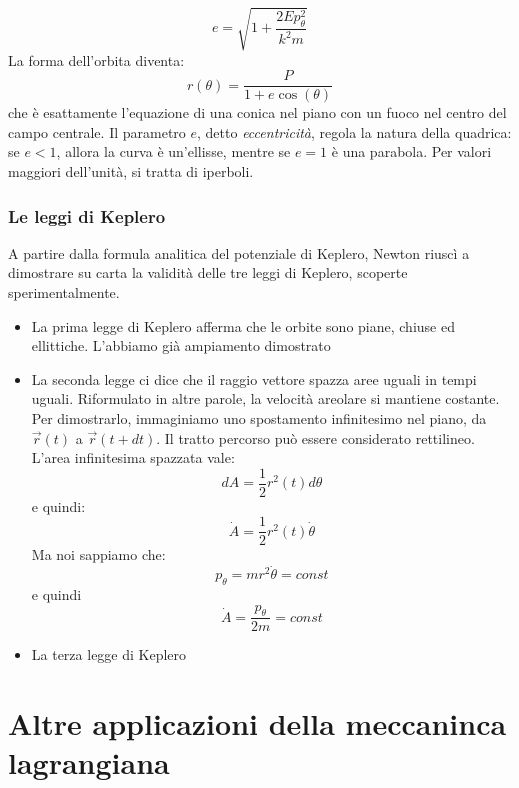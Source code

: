 \documentclass[a4paper,openany]{article}
\begin{document}
	\begin{equation}
		e =\sqrt{1+\dfrac{2Ep_{\theta}^2}{k^2m}}
	\end{equation}
	La forma dell'orbita diventa:
	\begin{equation}\label{key}
		r(\theta) = \dfrac{P}{1+e\cos(\theta)}
	\end{equation}
	che è esattamente l'equazione di una conica nel piano con un fuoco nel centro del campo centrale. Il parametro $e$, detto \textit{eccentricità}, regola la natura della quadrica: se $e<1$, allora la curva è un'ellisse, mentre se $e=1$ è una parabola. Per valori maggiori dell'unità, si tratta di iperboli.
	\subsubsection{Le leggi di Keplero}
	A partire dalla formula analitica del potenziale di Keplero, Newton riuscì a dimostrare su carta la validità delle tre leggi di Keplero, scoperte sperimentalmente.
	\begin{itemize}
		\item La prima legge di Keplero afferma che le orbite sono piane, chiuse ed ellittiche. L'abbiamo già ampiamento dimostrato
		\item La seconda legge ci dice che il raggio vettore spazza aree uguali in tempi uguali. Riformulato in altre parole, la velocità areolare si mantiene costante. Per dimostrarlo, immaginiamo uno spostamento infinitesimo nel piano, da $\vec{r}(t)$ a $\vec{r}(t+dt)$. Il tratto percorso può essere considerato rettilineo. L'area infinitesima spazzata vale:
		$$
		dA = \dfrac{1}{2}r^2(t)d\theta
		$$
		e quindi:
		$$
		\dot{A} = \dfrac{1}{2}r^2(t)\dot{\theta}
		$$
		Ma noi sappiamo che:
		$$
		p_{\theta} = mr^2\dot{\theta} = const
		$$
		e quindi
		$$
		\dot{A} = \dfrac{p_{\theta}}{2m} = const
		$$
		\item La terza legge di Keplero
	\end{itemize}
	\newpage
	\section{Altre applicazioni della meccaninca lagrangiana}
\end{document}
